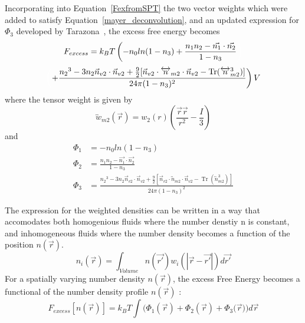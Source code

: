 \documentclass[double,12pt]{beavtex}
\begin{document}
Incorporating into Equation~\ref{FexfromSPT} the two vector weights which 
were added to satisfy Equation~\ref{mayer_deconvolution}, and an updated 
expression for $\Phi_3$ developed by Tarazona~\cite{tarazonaphi3, santos2012phi3}, 
the excess free energy becomes
\begin{displaymath}{F_{excess}=k_{B}T\left(-n_{0}ln(1-n_{3})+\frac{n_{1}n_{2}-\vec{n_{1}}\cdot\vec{n_{2}}}{1-n_{3}}\color{white}\right)}\end{displaymath}
\begin{equation}{\color{white}\left(\color{black}+\frac{{n_2}^3-3n_2\vec{n}_{v2}\cdot\vec{n}_{v2}+\frac{9}{2}[\vec{n}_{v2}\cdot{\overleftrightarrow{n}_{m2}}\cdot{\vec{n}_{v2}}-\operatorname{Tr}({\overleftrightarrow{n}^3_{m2}})]}{24\pi(1-n_3)^2}\right)\color{black}V}\end{equation} 
where the tensor weight is given by
\begin{equation}{\overleftrightarrow{w}_{m2}(\vec{r})=w_2(r)\left(\frac{\vec{r}\vec{r}}{r^2}-\frac{I}{3}\right)}\end{equation} 
and
\begin{align}
\Phi_1 &= -n_{0}ln(1-n_{3}) \\
\Phi_2 &= \frac{n_{1}n_{2}-\vec{n_{1}}\cdot\vec{n_{2}}}{1-n_{3}} \\
\Phi_3 &= \frac{{n_2}^3-3n_2\vec{n}_{v2}\cdot\vec{n}_{v2}+\frac{9}{2}[\vec{n}_{v2}\cdot{\overleftrightarrow{n}_{m2}}\cdot{\vec{n}_{v2}}-\operatorname{Tr}({\overleftrightarrow{n}^3_{m2}})]}{24\pi(1-n_3)^2}  
\end{align}

The expression for the weighted densities can be written in a way that 
accomodates both homogenious fluids where the number denstiy n is constant, 
and inhomogeneous fluids where the number density becomes a function of 
the position $n(\vec{r})$.
\begin{equation}{n_i(\vec{r})=\int_{Volume}{n(\vec{r'})w_i(|\vec{r}-\vec{r'}|)d{\vec{r'}}}}\end{equation}
For a spatially varying number density $n(\vec{r})$, the excess Free 
Energy becomes a functional of the number density profile $n(\vec{r})$ :
\begin{equation}{F_{excess}[n(\vec{r})]= k_BT\int(\Phi_1(\vec{r})+\Phi_2(\vec{r})+\Phi_3(\vec{r}{)) d}\vec{r}}\end{equation} 
\end{document}
